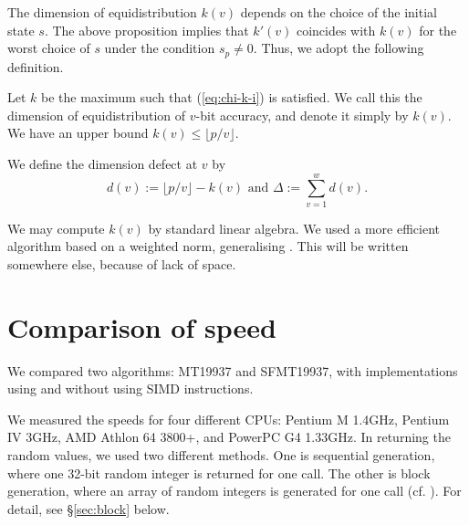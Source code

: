\documentclass{svmult}
\begin{document}
The dimension of equidistribution $k(v)$ depends on 
the choice of the initial state $s$. The above 
proposition implies that $k'(v)$ coincides 
with $k(v)$ for the worst choice of $s$ under the condition 
$s_p \neq 0$. Thus, we adopt the following definition.

\begin{definition}\label{def:virtual}
Let $k$ be the maximum such that
(\ref{eq:chi-k-i}) is satisfied. We call this
the dimension of equidistribution
of $v$-bit accuracy, and denote it simply by $k(v)$.
We have an upper bound $k(v) \leq \lfloor p/v \rfloor$.

We define the dimension defect at $v$
by
$$
d(v):=\lfloor p/v \rfloor - k(v) 
\mbox{ and } \Delta:=\sum_{v=1}^w d(v).
$$
\end{definition}
We may compute $k(v)$ by standard linear algebra.
We used a more efficient algorithm based on 
a weighted norm,
generalising \cite{CLT}. This will be written 
somewhere else,
because of lack of space.


\section{Comparison of  speed}\label{sec:comp-speed}
We compared two algorithms: MT19937 and SFMT19937,
with implementations using and without using SIMD instructions.

We measured the speeds for four different CPUs:
Pentium M 1.4GHz, Pentium IV 3GHz, 
AMD Athlon 64 3800+, and PowerPC G4 1.33GHz.  
In returning the random values, we used two different methods.
One is sequential generation, where one 32-bit random 
integer is returned for one call. 
The other is block generation, where an array
of random integers is generated for one call 
(cf. \cite{knuth:bible}). 
For detail, see \S\ref{sec:block} below. 
\end{document}

